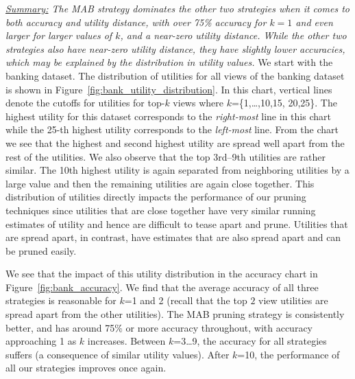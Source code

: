 {\em \underline{Summary:} The MAB strategy dominates the other two 
strategies when it comes to both accuracy and utility distance,
with over 75\% accuracy for $k = 1$ and even larger for larger
values of $k$, and a near-zero utility distance. 
While the other two strategies also have near-zero utility distance,
they have slightly lower accuracies, which may be explained by the 
distribution in utility values.
 }
We start with the banking dataset.
The distribution of utilities for all views of the banking dataset is
shown in Figure~\ref{fig:bank_utility_distribution}. 
In this chart, vertical lines denote the cutoffs for utilities for top-$k$ views
where $k$=\{1,\ldots,10,15, 20,25\}.
The highest utility for this dataset corresponds to the {\it right-most} line
in this chart while the 25-th highest utility corresponds to the {\it left-most}
line.
From the chart we see that the
highest and second highest utility are spread well apart from the rest of the
utilities.
We also observe that the top 3rd--9th utilities are rather similar. 
The 10th highest utility is again separated from neighboring utilities by a
large value and then the remaining utilities are again close together.
This distribution of utilities directly impacts the performance of our pruning
techniques since utilities that are close together have very similar running
estimates of utility and hence are difficult to tease apart and prune.
Utilities that are spread apart, in contrast, have estimates that are also
spread apart and can be pruned easily.

We see that the impact of this utility distribution in the accuracy chart in
Figure~\ref{fig:bank_accuracy}.
We find that the average accuracy of all three strategies is reasonable for
$k$=1 and 2 (recall that the top $2$ view utilities 
are spread apart from the other utilities). The MAB pruning strategy is 
consistently better, and has around 75\% or more accuracy throughout,
with accuracy approaching 1 as $k$ increases.
Between $k$=3\ldots9, the accuracy for all strategies suffers 
(a consequence of similar utility values).
After $k$=10, the performance of all our strategies improves once again.

